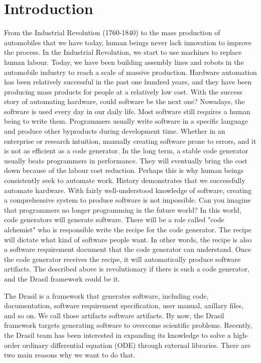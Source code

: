 \chapter{Introduction}
From the Industrial Revolution (1760-1840) to the mass production of automobiles that we have today, human beings never lack innovation to improve the process. In the Industrial Revolution, we start to use machines to replace human labour. Today, we have been building assembly lines and robots in the automobile industry to reach a scale of massive production. Hardware automation has been relatively successful in the past one hundred years, and they have been producing mass products for people at a relatively low cost. With the success story of automating hardware, could software be the next one? Nowadays, the software is used every day in our daily life. Most software still requires a human being to write them. Programmers usually write software in a specific language and produce other byproducts during development time. Whether in an enterprise or research intuition, manually creating software prone to errors, and it is not as efficient as a code generator. In the long term, a stable code generator usually beats programmers in performance. They will eventually bring the cost down because of the labour cost reduction. Perhaps this is why human beings consistently seek to automate work. History demonstrates that we successfully automate hardware. With fairly well-understood knowledge of software, creating a comprehensive system to produce software is not impossible. Can you imagine that programmers no longer programming in the future world? In this world, code generators will generate software. There will be a role called "code alchemist" who is responsible write the recipe for the code generator. The recipe will dictate what kind of software people want. In other words, the recipe is also a software requirement document that the code generator can understand. Once the code generator receives the recipe, it will automatically produce software artifacts. The described above is revolutionary if there is such a code generator, and the Drasil framework could be it.

The Drasil is a framework that generates software, including code, documentation, software requirement specification, user manual, axillary files, and so on. We call those artifacts software artifacts. By now, the Drasil framework targets generating software to overcome scientific problems. Recently, the Drasil team has been interested in expanding its knowledge to solve a high-order ordinary differential equation (ODE) through external libraries. There are two main reasons why we want to do that.

